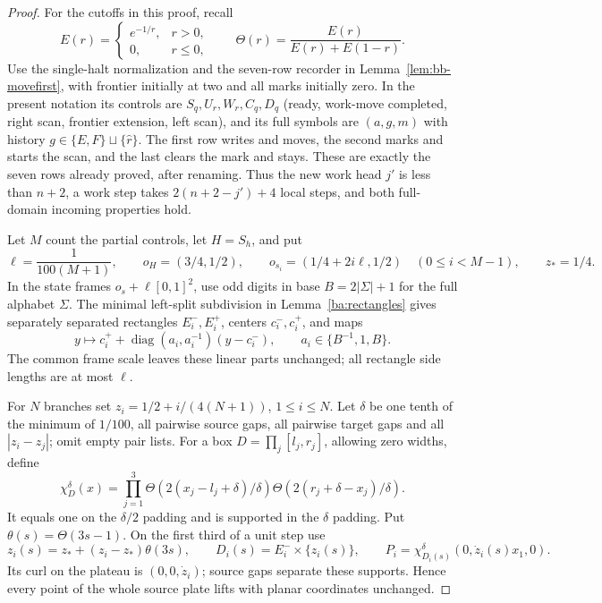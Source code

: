 \begin{proof}\label{ba:thin-sheet-torus-proof}
For the cutoffs in this proof, recall
\[
 E(r)=\begin{cases}e^{-1/r},&r>0,\\0,&r\le0,\end{cases}
 \qquad \Theta(r)=\frac{E(r)}{E(r)+E(1-r)}.
\]
Use the single-halt normalization and the seven-row recorder in
Lemma~\ref{lem:bb-movefirst}, with frontier initially at two and all marks
initially zero.  In the present notation its controls are
$S_q,U_r,W_r,C_q,D_q$ (ready, work-move completed, right scan,
frontier extension, left scan), and its full symbols are $(a,g,m)$
with history $g\in\{E,F\}\sqcup\{\widehat r\}$.
The first row writes and moves, the second marks and starts the scan,
and the last clears the mark and stays.  These are exactly the seven
rows already proved, after renaming.  Thus the new work head $j'$ is
less than $n+2$, a work step takes $2(n+2-j')+4$ local steps, and
both full-domain incoming properties hold.

Let $M$ count the partial controls, let $H=S_h$, and put
\[
 \ell=\frac1{100(M+1)},\qquad o_H=(3/4,1/2),\qquad
 o_{s_i}=(1/4+2i\ell,1/2)\quad(0\le i<M-1),\qquad z_*=1/4.
\]
In the state frames $o_s+\ell[0,1]^2$, use odd digits in base
$B=2|\Sigma|+1$ for the full alphabet $\Sigma$.  The minimal
left-split subdivision in Lemma~\ref{ba:rectangles} gives separately
separated rectangles $E_i^-,E_i^+$, centers $c_i^-,c_i^+$, and maps
\[
 y\longmapsto c_i^+
 +\operatorname{diag}(a_i,a_i^{-1})(y-c_i^-),
 \qquad a_i\in\{B^{-1},1,B\}.
\]
The common frame scale leaves these linear parts unchanged; all
rectangle side lengths are at most $\ell$.

For $N$ branches set $z_i=1/2+i/(4(N+1))$, $1\le i\le N$.
Let $\delta$ be one tenth of the minimum of $1/100$, all pairwise
source gaps, all pairwise target gaps and all $|z_i-z_j|$; omit empty
pair lists.  For a box $D=\prod_j[l_j,r_j]$, allowing zero widths,
define
\[
 \chi_D^\delta(x)=\prod_{j=1}^3
 \Theta\!\left(2(x_j-l_j+\delta)/\delta\right)
 \Theta\!\left(2(r_j+\delta-x_j)/\delta\right).
\]
It equals one on the $\delta/2$ padding and is supported in the
$\delta$ padding.  Put $\theta(s)=\Theta(3s-1)$.
On the first third of a unit step use
\[
 z_i(s)=z_*+(z_i-z_*)\theta(3s),\qquad
 D_i(s)=E_i^-\times\{z_i(s)\},\qquad
 P_i=\chi_{D_i(s)}^\delta(0,\dot z_i(s)x_1,0).
\]
Its curl on the plateau is $(0,0,\dot z_i)$; source gaps separate
these supports.  Hence every point of the whole source plate lifts
with planar coordinates unchanged.


\end{proof}

